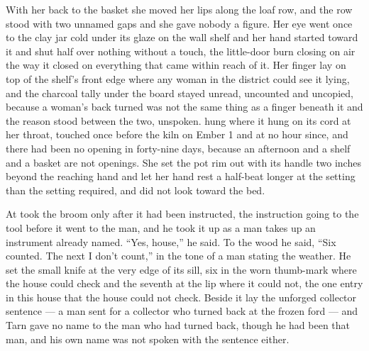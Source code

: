 With her back to the basket she moved her lips along the loaf row, and the row stood with two unnamed gaps and she gave nobody a figure. Her eye went once to the clay jar cold under its glaze on the wall shelf and her hand started toward it and shut half over nothing without a touch, the little-door burn closing on air the way it closed on everything that came within reach of it. Her finger lay on top of the shelf's front edge where any woman in the district could see it lying, and the charcoal tally under the board stayed unread, uncounted and uncopied, because a woman's back turned was not the same thing as a finger beneath it and the reason stood between the two, unspoken.  hung where it hung on its cord at her throat, touched once before the kiln on Ember 1 and at no hour since, and there had been no opening in forty-nine days, because an afternoon and a shelf and a basket are not openings. She set the pot rim out with its handle two inches beyond the reaching hand and let her hand rest a half-beat longer at the setting than the setting required, and did not look toward the bed.

\scenebreak

At   took the broom only after it had been instructed, the instruction going to the tool before it went to the man, and he took it up as a man takes up an instrument already named. “Yes, house,” he said. To the wood he said, “Six counted. The next I don't count,” in the tone of a man stating the weather. He set the small knife at the very edge of its sill, six in the worn thumb-mark where the house could check and the seventh at the lip where it could not, the one entry in this house that the house could not check. Beside it lay the unforged collector sentence --- a man sent for a collector who turned back at the frozen ford --- and Tarn gave no name to the man who had turned back, though he had been that man, and his own name was not spoken with the sentence either.

